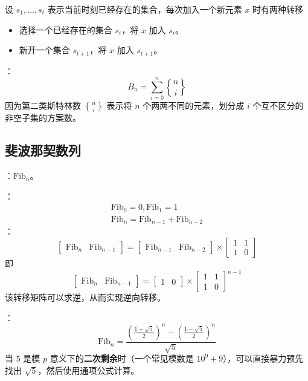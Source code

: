 设 $s_1, \dots, s_{t}$ 表示当前时刻已经存在的集合，每次加入一个新元素 $x$ 时有两种转移

\begin{itemize}
    \item 选择一个已经存在的集合 $s_i$，将 $x$ 加入 $s_i$。
    \item 新开一个集合 $s_{t + 1}$，将 $x$ 加入 $s_{t + 1}$。
\end{itemize}

：
\[
B_n = \sum_{i = 0}^n {n \brace i}
\]
因为第二类斯特林数 ${n \brace i}$ 表示将 $n$ 个两两不同的元素，划分成 $i$ 个互不区分的非空子集的方案数。

\subsection{斐波那契数列}

：$\mathrm{Fib}_n$。

：
\[
\begin{gathered}
\mathrm{Fib}_0 = 0, \mathrm{Fib}_1 = 1\\
\mathrm{Fib}_n = \mathrm{Fib}_{n - 1} + \mathrm{Fib}_{n - 2}
\end{gathered}
\]
：
\[
\begin{bmatrix}
\mathrm{Fib}_n & \mathrm{Fib}_{n - 1}
\end{bmatrix}
=
\begin{bmatrix}
\mathrm{Fib}_{n - 1} & \mathrm{Fib}_{n - 2}
\end{bmatrix}
\times
\begin{bmatrix}
1 & 1 \\
1 & 0
\end{bmatrix}
\]
即
\[
\begin{bmatrix}
\mathrm{Fib}_n & \mathrm{Fib}_{n - 1}
\end{bmatrix}
=
\begin{bmatrix}
1 & 0
\end{bmatrix}
\times
\begin{bmatrix}
1 & 1 \\
1 & 0
\end{bmatrix}^{n - 1}
\]
该转移矩阵可以求逆，从而实现逆向转移。

：
\[
\mathrm{Fib}_n = \frac{\left( \frac{1 + \sqrt{5}}{2} \right)^n - \left( \frac{1 - \sqrt{5}}{2} \right)^n}{\sqrt{5}}
\]
当 $5$ 是模 $p$ 意义下的\textbf{二次剩余}时（一个常见模数是 $10^9 + 9$），可以直接暴力预先找出 $\sqrt{5}$，然后使用通项公式计算。


